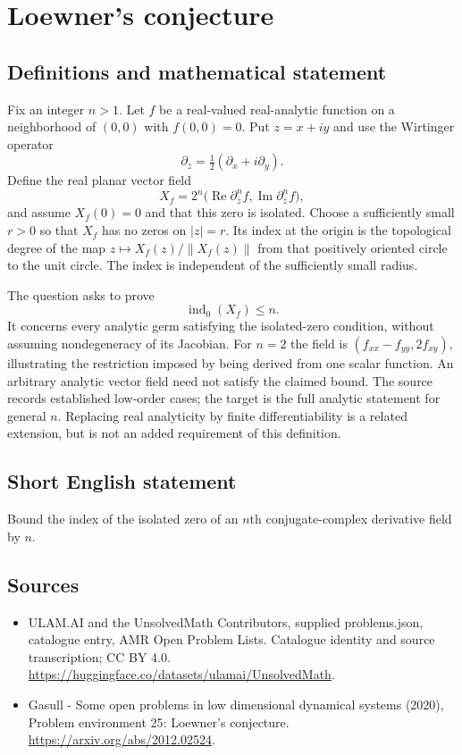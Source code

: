 \documentclass[11pt,a4paper]{article}
\begin{document}
\section*{Loewner's conjecture}\label{statement}

\subsection{Definitions and mathematical statement}
Fix an integer $n>1$. Let $f$ be a real-valued real-analytic function on
a neighborhood of $(0,0)$ with $f(0,0)=0$. Put $z=x+iy$ and use the
Wirtinger operator
\[
 \partial_{\bar z}=\tfrac12(\partial_x+i\partial_y).
\]
Define the real planar vector field
\[
 X_f=2^n\bigl(\operatorname{Re}\partial_{\bar z}^{n}f,
                 \operatorname{Im}\partial_{\bar z}^{n}f\bigr),
\]
and assume $X_f(0)=0$ and that this zero is isolated. Choose a sufficiently
small $r>0$ so that $X_f$ has no zeros on $|z|=r$. Its index at the origin
is the topological degree of the map
$z\mapsto X_f(z)/\|X_f(z)\|$ from that positively oriented circle to
the unit circle. The index is independent of the sufficiently small radius.

The question asks to prove
\[
 \operatorname{ind}_0(X_f)\le n.
\]
It concerns every analytic germ satisfying the isolated-zero condition,
without assuming nondegeneracy of its Jacobian. For $n=2$ the field is
$(f_{xx}-f_{yy},2f_{xy})$, illustrating the restriction imposed by being
derived from one scalar function. An arbitrary analytic vector field need
not satisfy the claimed bound. The source records established low-order
cases; the target is the full analytic statement for general $n$.
Replacing real analyticity by finite differentiability is a related
extension, but is not an added requirement of this definition.
\subsection{Short English statement}
Bound the index of the isolated zero of an $n$th conjugate-complex derivative field by $n$.
\subsection{Sources}
\begin{itemize}
\item[S1] ULAM.AI and the UnsolvedMath Contributors, supplied problems.json, catalogue entry, AMR Open Problem Lists. Catalogue identity and source transcription; CC BY 4.0.
\url{https://huggingface.co/datasets/ulamai/UnsolvedMath}.
\item[S2] Gasull - Some open problems in low dimensional dynamical systems (2020), Problem environment 25: Loewner's conjecture. 
\url{https://arxiv.org/abs/2012.02524}.
\end{itemize}
\end{document}
